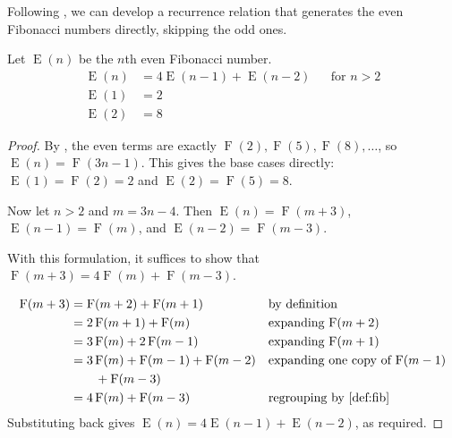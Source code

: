 \documentclass{article}
\begin{document}
Following , we can develop a recurrence relation that generates the even Fibonacci numbers directly,
skipping the odd ones.

\begin{lemma}\label{lem:relation}
  Let $\operatorname{E}(n)$ be the $n$th even Fibonacci number.
  \begin{align*}
    \operatorname{E}(n) &= 4\operatorname{E}(n-1) + \operatorname{E}(n-2)  &&\text{for $n > 2$} \\
    \operatorname{E}(1) &= 2 \\
    \operatorname{E}(2) &= 8
  \end{align*}
\end{lemma}
\begin{proof}
  By , the even terms are exactly $\operatorname{F}(2), \operatorname{F}(5), \operatorname{F}(8), \dots$,
  so $\operatorname{E}(n) = \operatorname{F}(3n-1)$. This gives the base cases directly:
  $\operatorname{E}(1) = \operatorname{F}(2) = 2$ and $\operatorname{E}(2) = \operatorname{F}(5) = 8$.

  Now let $n > 2$ and $m = 3n - 4$. Then $\operatorname{E}(n) = \operatorname{F}(m+3)$,
  $\operatorname{E}(n-1) = \operatorname{F}(m)$, and $\operatorname{E}(n-2) = \operatorname{F}(m-3)$.

  With this formulation, it suffices to show that
  $\operatorname{F}(m+3) = 4\operatorname{F}(m) + \operatorname{F}(m-3)$.

  \begin{align*}
    \operatorname{F}(m+3) &= \operatorname{F}(m + 2) + \operatorname{F}(m+1)  && \text{by definition} \\
                          &=  2\operatorname{F}(m + 1) + \operatorname{F}(m) && \text{expanding $\operatorname{F}(m+2)$} \\
                          &= 3\operatorname{F}(m) + 2\operatorname{F}(m-1) && \text{expanding $\operatorname{F}(m+1)$}\\
                          &= 3\operatorname{F}(m) + \operatorname{F}(m-1) + \operatorname{F}(m-2)
                                  && \text{expanding one copy of $\operatorname{F}(m-1)$} \\
                          &\qquad + \operatorname{F}(m-3) \\
                          &= 4\operatorname{F}(m) + \operatorname{F}(m-3)
                                  && \text{regrouping by \Cref{def:fib}}
  \end{align*}
  Substituting back gives $\operatorname{E}(n) = 4\operatorname{E}(n-1) + \operatorname{E}(n-2)$, as required.
\end{proof}
\end{document}
